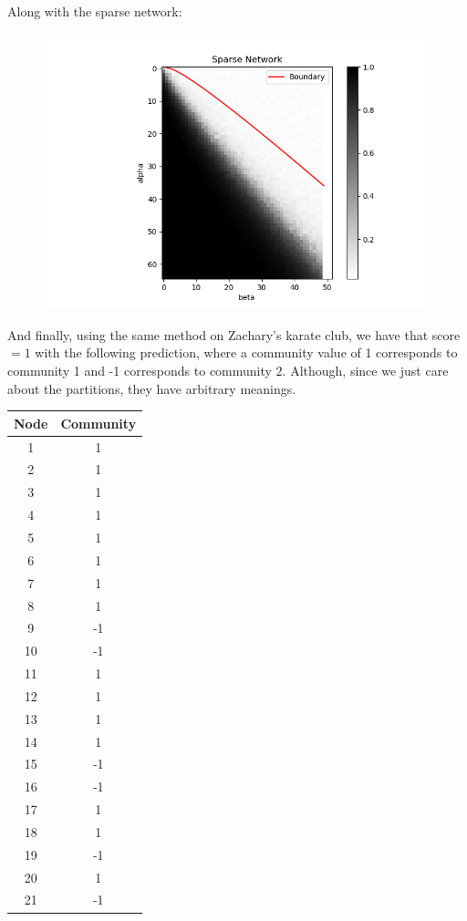 \documentclass[11pt]{article}
\begin{document}
\begin{enumerate}
\begin{figure}[H]
	\centering
	\end{figure}
	Along with the sparse network:
	\begin{figure}[H]
	\includegraphics[width=12cm]{SparseScoreGraph.png}
	\centering
	\end{figure}
	And finally, using the same method on Zachary's karate club, we have that score $=1$ with the following prediction, where a community value of 1 corresponds to community 1 and -1 corresponds to community 2. Although, since we just care about the partitions, they have arbitrary meanings.
	\begin{center}
	\begin{tabular}{|c|c|}
	\hline
	Node & Community \\
	\hline
	1 & 1 \\
	2 & 1 \\
	3 & 1 \\
	4 & 1 \\
	5 & 1 \\
	6 & 1 \\
	7 & 1 \\
	8 & 1 \\
	9 & -1 \\
	10 & -1 \\
	11 & 1 \\
	12 & 1 \\
	13 & 1 \\
	14 & 1 \\
	15 & -1 \\
	16 & -1 \\
	17 & 1 \\
	18 & 1 \\
	19 & -1 \\
	20 & 1 \\
	21 & -1 \\

\end{tabular}
\end{center}
\end{enumerate}
\end{document}
